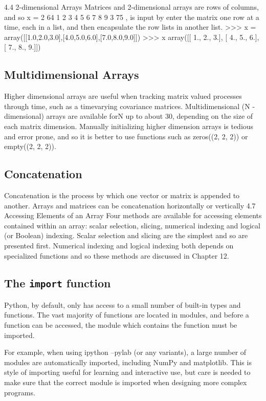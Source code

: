 \documentclass[KSmain.tex]{subfiles}
\begin{document}
\newpage

4.4 2-dimensional Arrays
Matrices and 2-dimensional arrays are rows of columns, and so
x =
2
64
1 2 3
4 5 6
7 8 9
3
75
,
is input by enter the matrix one row at a time, each in a list, and then encapsulate the row lists in another
list.
>>> x = array([[1.0,2.0,3.0],[4.0,5.0,6.0],[7.0,8.0,9.0]])
>>> x
array([[ 1., 2., 3.],
[ 4., 5., 6.],
[ 7., 8., 9.]])
\newpage
\subsection{Multidimensional Arrays}
Higher dimensional arrays are useful when tracking matrix valued processes through time, such as a timevarying
covariance matrices. Multidimensional (N -dimensional) arrays are available forN up to about 30,
depending on the size of each matrix dimension. Manually initializing higher dimension arrays is tedious
and error prone, and so it is better to use functions such as zeros((2, 2, 2)) or empty((2, 2, 2)).
\newpage
\subsection{Concatenation}
Concatenation is the process by which one vector or matrix is appended to another. Arrays and matrices
can be concatenation horizontally or vertically
4.7 Accessing Elements of an Array
Four methods are available for accessing elements contained within an array: scalar selection, slicing,
numerical indexing and logical (or Boolean) indexing. Scalar selection and slicing are the simplest and so
are presented first. Numerical indexing and logical indexing both depends on specialized functions and
so these methods are discussed in Chapter 12.
\newpage
\subsection{The \texttt{import} function}
Python, by default, only has access to a small number of built-in types and functions. The vast majority of
functions are located in modules, and before a function can be accessed, the module which contains the
function must be imported. 

For example, when using ipython --pylab (or any variants), a large number
of modules are automatically imported, including NumPy and matplotlib. This is style of importing useful
for learning and interactive use, but care is needed to make sure that the correct module is imported when
designing more complex programs.
\end{document}
